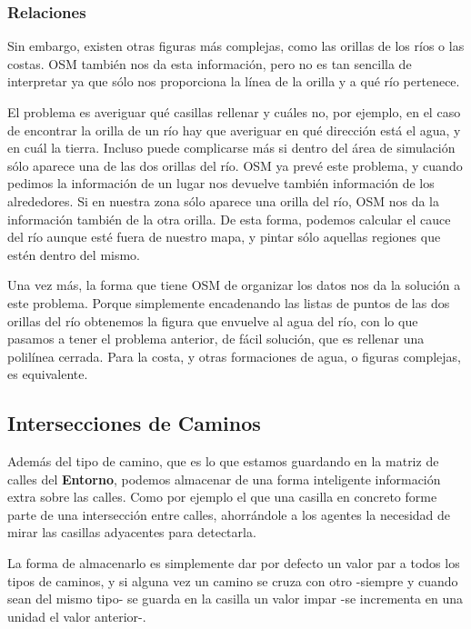 \subsubsection{Relaciones}

Sin embargo, existen otras figuras más complejas, como las orillas de los ríos
o las costas. OSM también nos da esta información, pero no es tan sencilla de
interpretar ya que sólo nos proporciona la línea de la orilla y a qué río
pertenece.

El problema es averiguar qué casillas rellenar y cuáles no, por ejemplo, en el
caso de encontrar la orilla de un río hay que averiguar en qué dirección está
el agua, y en cuál la tierra. Incluso puede complicarse más si dentro del área
de simulación sólo aparece una de las dos orillas del río. OSM ya prevé este
problema, y cuando pedimos la información de un lugar nos devuelve también
información de los alrededores. Si en nuestra zona sólo aparece una orilla del
río, OSM nos da la información también de la otra orilla. De esta forma, podemos
calcular el cauce del río aunque esté fuera de nuestro mapa, y pintar sólo
aquellas regiones que estén dentro del mismo.

Una vez más, la forma que tiene OSM de organizar los datos nos da la solución
a este problema. Porque simplemente encadenando las listas de puntos de las dos
orillas del río obtenemos la figura que envuelve al agua del río, con lo que
pasamos a tener el problema anterior, de fácil solución, que es rellenar una
polilínea cerrada. Para la costa, y otras formaciones de agua, o figuras
complejas, es equivalente.

\subsection{Intersecciones de Caminos}

Además del tipo de camino, que es lo que estamos guardando en la matriz de
calles del {\bf Entorno}, podemos almacenar de una forma inteligente información
extra sobre las calles. Como por ejemplo el que una casilla en concreto forme
parte de una intersección entre calles, ahorrándole a los agentes la necesidad
de mirar las casillas adyacentes para detectarla.

La forma de almacenarlo es simplemente dar por defecto un valor par a todos los
tipos de caminos, y si alguna vez un camino se cruza con otro -siempre y cuando
sean del mismo tipo- se guarda en la casilla un valor impar -se incrementa en
una unidad el valor anterior-.

